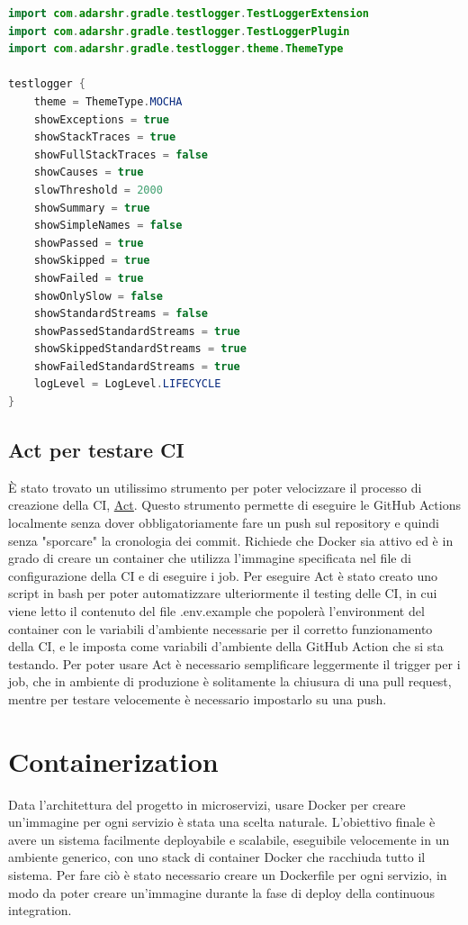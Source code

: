\begin{lstlisting}[language=Java, caption={Test logger}, label=list:gradle_testlogger]
import com.adarshr.gradle.testlogger.TestLoggerExtension
import com.adarshr.gradle.testlogger.TestLoggerPlugin
import com.adarshr.gradle.testlogger.theme.ThemeType

testlogger {
    theme = ThemeType.MOCHA
    showExceptions = true
    showStackTraces = true
    showFullStackTraces = false
    showCauses = true
    slowThreshold = 2000
    showSummary = true
    showSimpleNames = false
    showPassed = true
    showSkipped = true
    showFailed = true
    showOnlySlow = false
    showStandardStreams = false
    showPassedStandardStreams = true
    showSkippedStandardStreams = true
    showFailedStandardStreams = true
    logLevel = LogLevel.LIFECYCLE
}
\end{lstlisting}

\subsection{Act per testare CI}

È stato trovato un utilissimo strumento per poter velocizzare il processo di creazione della CI, \href{https://github.com/nektos/act}{\underline{Act}}. Questo strumento permette di eseguire le GitHub Actions localmente senza dover obbligatoriamente fare un push sul repository e quindi senza "sporcare" la cronologia dei commit. Richiede che Docker sia attivo ed è in grado di creare un container che utilizza l'immagine specificata nel file di configurazione della CI e di eseguire i job. Per eseguire Act è stato creato uno script in bash per poter automatizzare ulteriormente il testing delle CI, in cui viene letto il contenuto del file .env.example che popolerà l'environment del container con le variabili d'ambiente necessarie per il corretto funzionamento della CI, e le imposta come variabili d'ambiente della GitHub Action che si sta testando. Per poter usare Act è necessario semplificare leggermente il trigger per i job, che in ambiente di produzione è solitamente la chiusura di una pull request, mentre per testare velocemente è necessario impostarlo su una push.

\section{Containerization}

Data l'architettura del progetto in microservizi, usare Docker per creare un'immagine per ogni servizio è stata una scelta naturale. 
L'obiettivo finale è avere un sistema facilmente deployabile e scalabile, eseguibile velocemente in un ambiente generico, con uno stack di container Docker che racchiuda tutto il sistema.
Per fare ciò è stato necessario creare un Dockerfile per ogni servizio, in modo da poter creare un'immagine durante la fase di deploy della continuous integration.
\vspace{1cm}

